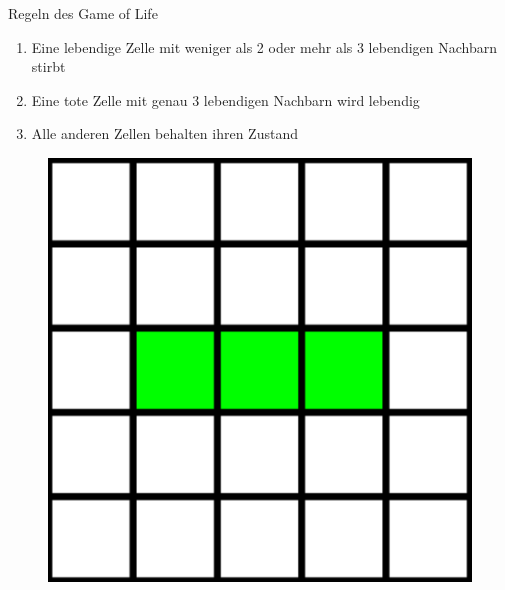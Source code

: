 \documentclass[aspectratio=169]{beamer}
\begin{document}
  \begin{frame}{Regeln des Game of Life}

    \begin{enumerate}
      \item Eine lebendige Zelle mit weniger als 2 oder mehr als 3 lebendigen Nachbarn stirbt %
      \item Eine tote Zelle mit genau 3 lebendigen Nachbarn wird lebendig %
      \item Alle anderen Zellen behalten ihren Zustand
    \end{enumerate}

    \pause

    \begin{multicols*}{3}

      \begin{figure}[H]
          \centering
          \includegraphics[height = 0.3 \textheight]{start_oscillator.png}
      \end{figure}

      \pause


\end{multicols*}
\end{frame}
\end{document}

